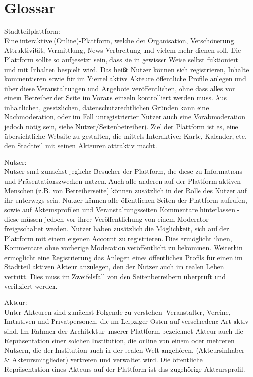 \documentclass{swp}
\begin{document}
\section{Glossar}
Stadtteilplattform: \\Eine interaktive (Online)-Plattform, welche der Organisation, Versch\"onerung, Attraktivit\"at, Vermittlung, \glqq News-Verbreitung\grqq{} und vielem mehr dienen soll. Die Plattform sollte so aufgesetzt sein, dass sie in gewisser Weise selbst fuktioniert und mit Inhalten bespielt wird. Das hei{\ss}t Nutzer k\"onnen sich registrieren, Inhalte kommentieren sowie f\"ur im Viertel aktive Akteure \"offentliche Profile anlegen und \"uber diese Veranstaltungen und Angebote ver\"offentlichen, ohne dass alles von einem Betreiber der Seite im Voraus einzeln kontrolliert werden muss. Aus inhaltlichen, gesetzlichen, datenschutzrechtlichen Gr\"unden kann eine Nachmoderation, oder im Fall unregistrierter Nutzer auch eine Vorabmoderation jedoch n\"otig sein, siehe \glqq Nutzer\grqq{}/\glqq Seitenbetreiber\grqq{}). Ziel der Plattform ist es, eine \"ubersichtliche Website zu gestalten, die mittels Interaktiver Karte, Kalender, etc. den Stadtteil mit seinen Akteuren attraktiv macht.

Nutzer:\\Nutzer sind zun\"achst jegliche Besucher der Plattform, die diese zu Informations- und Pr\"asentationszwecken nutzen. Auch alle anderen auf der Plattform aktiven Menschen (z.B. von Betreiberseite) k\"onnen zus\"atzlich in der Rolle des Nutzer auf ihr unterwegs sein. Nutzer k\"onnen alle \"offentlichen Seiten der Plattform aufrufen, sowie auf Akteursprofilen und Veranstaltungsseiten Kommentare hinterlassen - diese m\"ussen jedoch vor ihrer Ver\"offentlichung von einem Moderator freigeschaltet werden. 
Nutzer haben zus\"atzlich die M\"oglichkeit, sich auf der Plattform mit einem eigenen Account zu registrieren. Dies erm\"oglicht ihnen, Kommentare ohne vorherige Moderation ver\"offentlicht zu bekommen. Weiterhin erm\"oglicht eine Registrierung das Anlegen eines \"offentlichen Profils f\"ur einen im Stadtteil aktiven Akteur anzulegen, den der Nutzer auch im realen Leben vertritt. Dies muss im Zweifelsfall von den Seitenbetreibern \"uberpr\"uft und verifiziert werden.

Akteur:\\
Unter Akteuren sind zun\"achst Folgende zu verstehen: Veranstalter, Vereine, Initiativen und Privatpersonen, die im Leipziger Osten auf verschiedene Art aktiv sind. Im Rahmen der Architektur unserer Plattform bezeichnet \glqq Akteur\grqq{} auch die Repr\"asentation einer solchen Institution, die online von einem oder mehreren Nutzern, die der Institution auch in der realen Welt angeh\"oren, (Akteursinhaber \& Akteursmitglieder) vertreten und verwaltet wird. Die \"offentliche Repr\"asentation eines Akteurs auf der Plattform ist das zugeh\"orige Akteursprofil.
\end{document}
